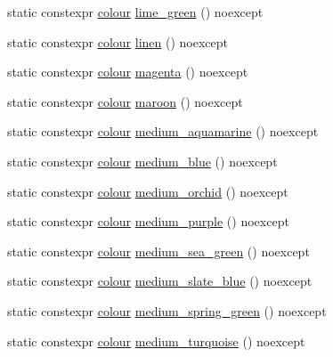 \begin{DoxyCompactItemize}
\item 
static constexpr \mbox{\hyperlink{classmoka_1_1colour}{colour}} \mbox{\hyperlink{classmoka_1_1colour_a47cbf0375a2ca712b398b35518787c96}{lime\+\_\+green}} () noexcept
\item 
static constexpr \mbox{\hyperlink{classmoka_1_1colour}{colour}} \mbox{\hyperlink{classmoka_1_1colour_a4ec7680384f8e5cb605e1f4841e04eba}{linen}} () noexcept
\item 
static constexpr \mbox{\hyperlink{classmoka_1_1colour}{colour}} \mbox{\hyperlink{classmoka_1_1colour_ad6fb2a2ae44257c285f191398a51303f}{magenta}} () noexcept
\item 
static constexpr \mbox{\hyperlink{classmoka_1_1colour}{colour}} \mbox{\hyperlink{classmoka_1_1colour_a7d81cd638c65e535c64adfe73fc4b91f}{maroon}} () noexcept
\item 
static constexpr \mbox{\hyperlink{classmoka_1_1colour}{colour}} \mbox{\hyperlink{classmoka_1_1colour_a4985cc7638b3548343bf4d7bb7d0150a}{medium\+\_\+aquamarine}} () noexcept
\item 
static constexpr \mbox{\hyperlink{classmoka_1_1colour}{colour}} \mbox{\hyperlink{classmoka_1_1colour_ac83767e582c0f0c1189958789d2e5f78}{medium\+\_\+blue}} () noexcept
\item 
static constexpr \mbox{\hyperlink{classmoka_1_1colour}{colour}} \mbox{\hyperlink{classmoka_1_1colour_af005c75898bb6fe21cef0b7a6b98da52}{medium\+\_\+orchid}} () noexcept
\item 
static constexpr \mbox{\hyperlink{classmoka_1_1colour}{colour}} \mbox{\hyperlink{classmoka_1_1colour_a789925f497faf5d74422cb82697cbf2a}{medium\+\_\+purple}} () noexcept
\item 
static constexpr \mbox{\hyperlink{classmoka_1_1colour}{colour}} \mbox{\hyperlink{classmoka_1_1colour_ad8ddb747e935e376dac4584546b465c3}{medium\+\_\+sea\+\_\+green}} () noexcept
\item 
static constexpr \mbox{\hyperlink{classmoka_1_1colour}{colour}} \mbox{\hyperlink{classmoka_1_1colour_a05b97af96e7840d17f41b7c44eae71f9}{medium\+\_\+slate\+\_\+blue}} () noexcept
\item 
static constexpr \mbox{\hyperlink{classmoka_1_1colour}{colour}} \mbox{\hyperlink{classmoka_1_1colour_a50c874851964ba13bb4c0b3f8c1aca85}{medium\+\_\+spring\+\_\+green}} () noexcept
\item 
static constexpr \mbox{\hyperlink{classmoka_1_1colour}{colour}} \mbox{\hyperlink{classmoka_1_1colour_a24f1d3a557f9ae55e4ba70a166893000}{medium\+\_\+turquoise}} () noexcept
\item 

\end{DoxyCompactItemize}
